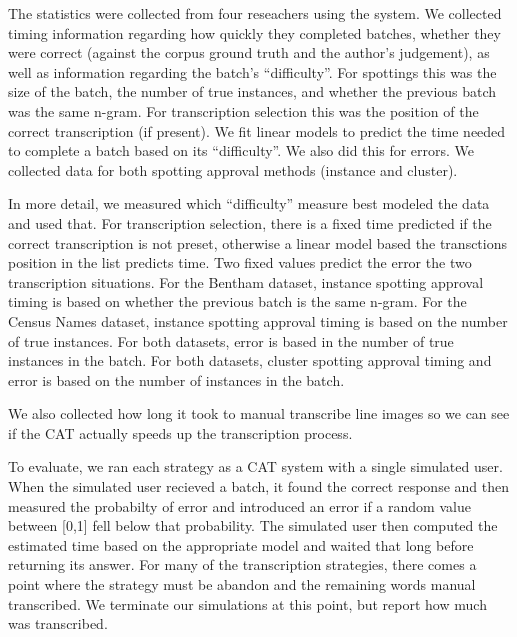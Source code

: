 \documentclass[ms,electronic,twosidetoc,letterpaper,chaptercenter,parttop,lol,lof,lot]{byumsphd}
\begin{document}
The statistics were collected from four reseachers
using the system. We collected timing information regarding how quickly they completed batches, whether they were correct (against the corpus ground truth and the author's judgement), as well as information regarding the batch's ``difficulty''. For spottings this was the size of the batch, the number of true instances, and whether the previous batch was the same n-gram. For transcription selection this was the position of the correct transcription (if present). 
We fit linear models to predict the time needed to complete a batch based on its ``difficulty''. We also did this for errors.
We collected data for both spotting approval methods (instance and cluster).

In more detail, we measured which ``difficulty'' measure best modeled the data and used that. For transcription selection, there is a fixed time predicted if the correct transcription is not preset, otherwise a linear model based the transctions position in the list predicts time. Two fixed values predict the error the two transcription situations. 
For the Bentham dataset, instance spotting approval timing is based on whether the previous batch is the same n-gram. For the Census Names dataset, instance spotting approval timing is based on the number of true instances. For both datasets, error is based in the number of true instances in the batch. For both datasets, cluster spotting approval timing and error is based on the number of instances in the batch.

We also collected how long it took to manual transcribe line images so we can see if the CAT actually speeds up the transcription process.

To evaluate, we ran each strategy as a CAT system with a single simulated user. When the simulated user recieved a batch, it found the correct response and then measured the probabilty of error and introduced an error if a random value between [0,1] fell below that probability. The simulated user then computed the estimated time based on the appropriate model and waited that long before returning its answer. For many of the transcription strategies, there comes a point where the strategy must be abandon and the remaining words manual transcribed. We terminate our simulations at this point, but report how much was transcribed.
\end{document}
